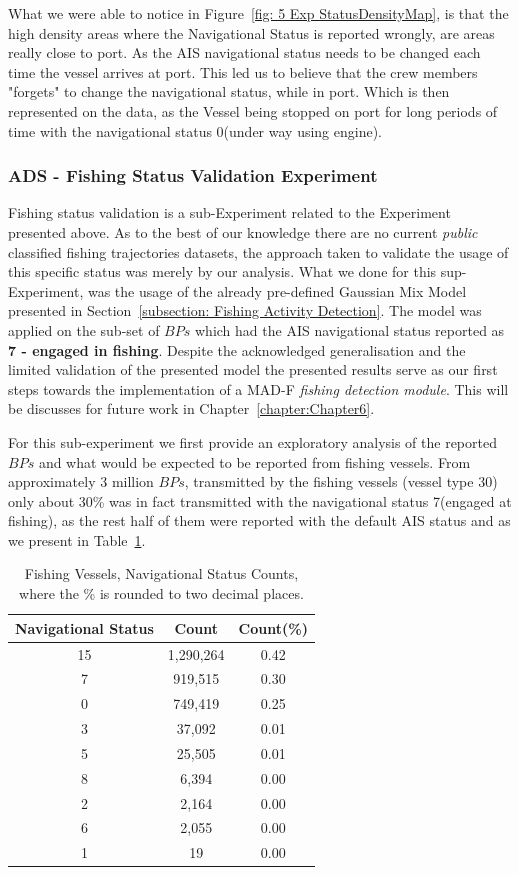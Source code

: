 What we were able to notice in Figure~\ref{fig: 5 Exp StatusDensityMap}, is that the high density areas where the Navigational Status is reported wrongly, are areas really close to port. As the AIS navigational status needs to be changed each time the vessel arrives at port. This led us to believe that the crew members "forgets" to change the navigational status, while in port. Which is then represented on the data, as the Vessel being stopped on port for long periods of time with the navigational status 0(under way using engine). 

\subsubsection{ADS - Fishing Status Validation Experiment}
\label{subsection: ch5 fishing validation}
Fishing status validation is a sub-Experiment related to the Experiment presented above. As to the best of our knowledge there are no current \emph{public} classified fishing trajectories datasets, the approach taken to validate the usage of this specific status was merely by our analysis. What we done for this sup-Experiment, was the usage of the already pre-defined Gaussian Mix Model presented in Section~\ref{subsection: Fishing Activity Detection}. The model was applied on the sub-set of $BPs$ which had the AIS navigational status reported as \textbf{7 - engaged in fishing}. Despite the acknowledged generalisation and the limited validation of the presented model the presented results serve as our first steps towards the implementation of a MAD-F \emph{fishing detection module}. This will be discusses for future work in Chapter~\ref{chapter:Chapter6}. 

For this sub-experiment we first provide an exploratory analysis of the reported $BPs$ and what would be expected to be reported from fishing vessels. From approximately 3 million $BPs$, transmitted by the fishing vessels (vessel type 30) only about 30\% was in fact transmitted with the navigational status 7(engaged at fishing), as the rest half of them were reported with the default AIS status and as we present in Table~\ref{Table : 5 Fishing Status Counts}. 

\begin{table}[H]
\centering
\caption{Fishing Vessels, Navigational Status Counts, where the \% is rounded to two decimal places.}
\label{Table : 5 Fishing Status Counts}
\begin{tabular}{@{}ccc@{}}
\toprule
Navigational Status & Count & Count(\%) \\ \midrule
15 & 1,290,264 & 0.42 \\
7 & 919,515 & 0.30 \\
0 & 749,419 & 0.25 \\
3 & 37,092 & 0.01 \\
5 & 25,505 & 0.01 \\
8 & 6,394 & 0.00 \\
2 & 2,164 & 0.00 \\
6 & 2,055 & 0.00 \\
1 & 19 & 0.00 \\ \bottomrule
\end{tabular}
\end{table}

